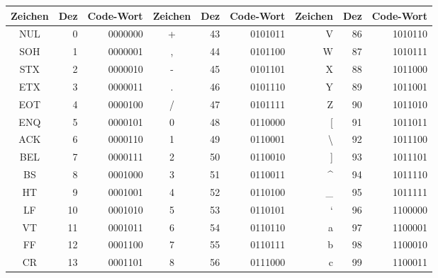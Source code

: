 \begin{table}[!htbp]
\centering
\begin{tabular}{|c|r|r||c|r|r||r|r|r|}
\hline
Zeichen & Dez & Code-Wort & Zeichen & Dez & Code-Wort & Zeichen          & Dez & Code-Wort \\ \hline
\hline
NUL     & 0       	& 0000000     & +       & 43      		& 0101011           & V                & 86      	& 1010110           \\ \hline
SOH     & 1       & 0000001         & ,       & 44     		& 0101100          & W                & 87      	& 1010111         \\ \hline
STX     & 2       	& 0000010        & -       & 45      		& 0101101          & X                & 88      	& 1011000          \\ \hline
ETX     & 3       	& 0000011        & .       & 46      		& 0101110         & Y                & 89      	& 1011001          \\ \hline 
EOT     & 4       	& 0000100          & /       & 47   		& 0101111          & Z                & 90      	& 1011010          \\ \hline
ENQ     & 5       & 0000101          & 0       & 48   		& 0110000          & [                & 91      	& 1011011          \\ \hline
ACK     & 6       & 0000110           & 1       & 49  		& 0110001          & \textbackslash   & 92  	& 1011100          \\ \hline
BEL     & 7       	& 0000111          & 2       & 50  		& 0110010          & ]                & 93      	& 1011101          \\ \hline
BS      & 8       	& 0001000         & 3       & 51   		& 0110011          & \textasciicircum & 94   	& 1011110          \\ \hline
HT     & 9       	& 0001001          & 4       & 52  		& 0110100          & \_               & 95      	& 1011111         \\ \hline
LF      & 10      	& 0001010           & 5       & 53      	& 0110101          & `                & 96      	& 1100000          \\ \hline
VT      & 11      	& 0001011          & 6       & 54      	& 0110110          & a                & 97      	& 1100001          \\ \hline
FF      & 12      	& 0001100         & 7       & 55      	& 0110111          & b                & 98      	& 1100010         \\ \hline
CR      & 13      	& 0001101           & 8       & 56      	& 0111000          & c                & 99      	& 1100011          \\ \hline

\end{tabular}
\end{table}
